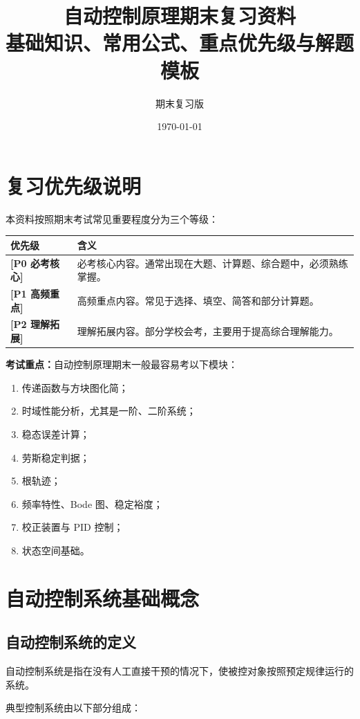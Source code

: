 \documentclass[UTF8,a4paper,12pt]{ctexart}
\title{\Huge 自动控制原理期末复习资料\\[0.5em]
\Large 基础知识、常用公式、重点优先级与解题模板}
\author{期末复习版}
\date{\today}
\newcommand{\Pzero}{\textcolor{p0}{\textbf{[P0 必考核心]}}}
\newcommand{\Pone}{\textcolor{p1}{\textbf{[P1 高频重点]}}}
\newcommand{\Ptwo}{\textcolor{p2}{\textbf{[P2 理解拓展]}}}
\newcommand{\exam}{\textcolor{p0}{\textbf{考试重点：}}}
\begin{document}
\maketitle
\tableofcontents
\newpage

\section{复习优先级说明}

本资料按照期末考试常见重要程度分为三个等级：

\begin{longtable}{p{3cm}p{11cm}}
\toprule
优先级 & 含义 \\
\midrule
\Pzero & 必考核心内容。通常出现在大题、计算题、综合题中，必须熟练掌握。 \\
\Pone & 高频重点内容。常见于选择、填空、简答和部分计算题。 \\
\Ptwo & 理解拓展内容。部分学校会考，主要用于提高综合理解能力。 \\
\bottomrule
\end{longtable}

\exam 自动控制原理期末一般最容易考以下模块：

\begin{enumerate}
    \item 传递函数与方块图化简；
    \item 时域性能分析，尤其是一阶、二阶系统；
    \item 稳态误差计算；
    \item 劳斯稳定判据；
    \item 根轨迹；
    \item 频率特性、Bode 图、稳定裕度；
    \item 校正装置与 PID 控制；
    \item 状态空间基础。
\end{enumerate}

\newpage

\section{自动控制系统基础概念}

\subsection{自动控制系统的定义}

自动控制系统是指在没有人工直接干预的情况下，使被控对象按照预定规律运行的系统。

典型控制系统由以下部分组成：
\end{document}

